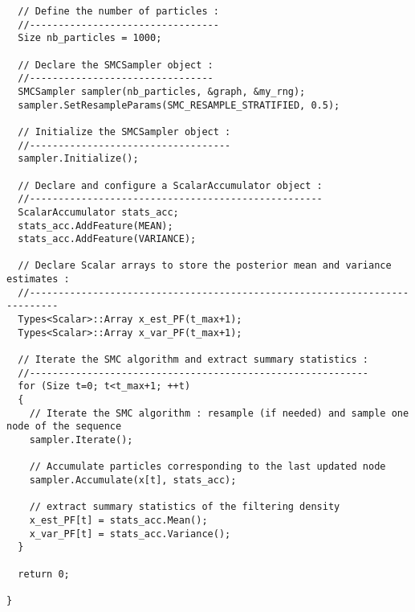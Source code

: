 \begin{lstlisting}
  // Define the number of particles :
  //---------------------------------
  Size nb_particles = 1000;

  // Declare the SMCSampler object :
  //--------------------------------
  SMCSampler sampler(nb_particles, &graph, &my_rng);
  sampler.SetResampleParams(SMC_RESAMPLE_STRATIFIED, 0.5);

  // Initialize the SMCSampler object :
  //-----------------------------------
  sampler.Initialize();

  // Declare and configure a ScalarAccumulator object :
  //---------------------------------------------------
  ScalarAccumulator stats_acc;
  stats_acc.AddFeature(MEAN);
  stats_acc.AddFeature(VARIANCE);

  // Declare Scalar arrays to store the posterior mean and variance estimates :
  //---------------------------------------------------------------------------
  Types<Scalar>::Array x_est_PF(t_max+1);
  Types<Scalar>::Array x_var_PF(t_max+1);

  // Iterate the SMC algorithm and extract summary statistics :
  //-----------------------------------------------------------
  for (Size t=0; t<t_max+1; ++t)
  {
    // Iterate the SMC algorithm : resample (if needed) and sample one node of the sequence
    sampler.Iterate();

    // Accumulate particles corresponding to the last updated node
    sampler.Accumulate(x[t], stats_acc);

    // extract summary statistics of the filtering density
    x_est_PF[t] = stats_acc.Mean();
    x_var_PF[t] = stats_acc.Variance();
  }

  return 0;

}
\end{lstlisting}
% 
% 
